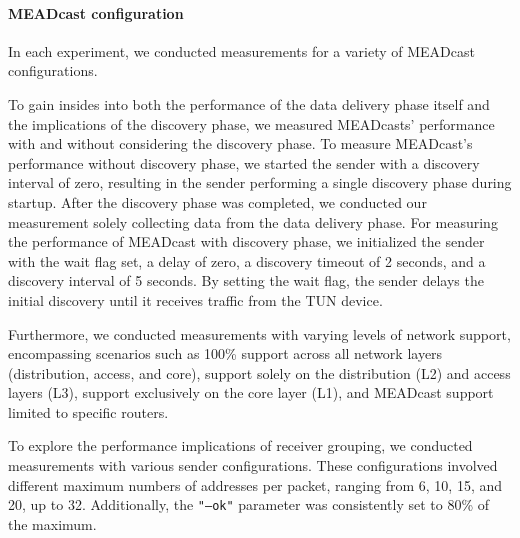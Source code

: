 \paragraph{MEADcast configuration} %
\label{par:MEADcast configuration}
In each experiment, we conducted measurements for a variety of MEADcast
    configurations.

To gain insides into both the performance of the data delivery phase itself and
    the implications of the discovery phase, we measured MEADcasts' performance
    with and without considering the discovery phase.
To measure MEADcast's performance without discovery phase, we started the
    sender with a discovery interval of zero, resulting in the sender
    performing a single discovery phase during startup.
After the discovery phase was completed, we conducted our measurement solely
    collecting data from the data delivery phase.
For measuring the performance of MEADcast with discovery phase, we initialized
    the sender with the wait flag set, a delay of zero, a discovery timeout of
    2 seconds, and a discovery interval of 5 seconds.
By setting the wait flag, the sender delays the initial discovery until it
    receives traffic from the TUN device.

Furthermore, we conducted measurements with varying levels of network support,
    encompassing scenarios such as 100\% support across all network layers
    (distribution, access, and core), support solely on the distribution (L2)
    and access layers (L3), support exclusively on the core layer (L1), and
    MEADcast support limited to specific routers.

To explore the performance implications of receiver grouping, we conducted
    measurements with various sender configurations.
These configurations involved different maximum numbers of addresses per
    packet, ranging from 6, 10, 15, and 20, up to 32.
Additionally, the \texttt{"--ok"} parameter was consistently set to 80\% of the
    maximum.


